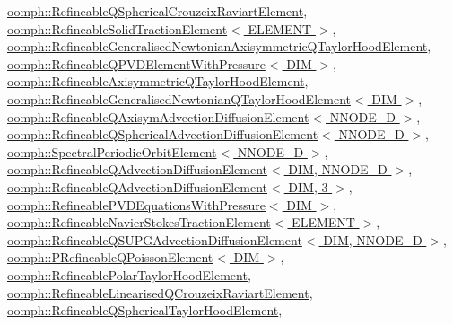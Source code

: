 \hyperlink{classoomph_1_1RefineableQSphericalCrouzeixRaviartElement_ab2d2448ca25da6b58a565a8ca18c5e06}{oomph\+::\+Refineable\+Q\+Spherical\+Crouzeix\+Raviart\+Element}, \hyperlink{classoomph_1_1RefineableSolidTractionElement_a9119a5b387cf3e5c3e3dee4dcabb08a3}{oomph\+::\+Refineable\+Solid\+Traction\+Element$<$ E\+L\+E\+M\+E\+N\+T $>$}, \hyperlink{classoomph_1_1RefineableGeneralisedNewtonianAxisymmetricQTaylorHoodElement_a9c1262e9d7ec08866b86214da5730f3c}{oomph\+::\+Refineable\+Generalised\+Newtonian\+Axisymmetric\+Q\+Taylor\+Hood\+Element}, \hyperlink{classoomph_1_1RefineableQPVDElementWithPressure_aa73ec04c55ee434543ee171bdd1da914}{oomph\+::\+Refineable\+Q\+P\+V\+D\+Element\+With\+Pressure$<$ D\+I\+M $>$}, \hyperlink{classoomph_1_1RefineableAxisymmetricQTaylorHoodElement_af1fe431fc8cdb9df1533b58bef408c49}{oomph\+::\+Refineable\+Axisymmetric\+Q\+Taylor\+Hood\+Element}, \hyperlink{classoomph_1_1RefineableGeneralisedNewtonianQTaylorHoodElement_a010adb919ba9b8850e5f586467777052}{oomph\+::\+Refineable\+Generalised\+Newtonian\+Q\+Taylor\+Hood\+Element$<$ D\+I\+M $>$}, \hyperlink{classoomph_1_1RefineableQAxisymAdvectionDiffusionElement_a6882fc29a65017f8971fcc1785556aad}{oomph\+::\+Refineable\+Q\+Axisym\+Advection\+Diffusion\+Element$<$ N\+N\+O\+D\+E\+\_\+D $>$}, \hyperlink{classoomph_1_1RefineableQSphericalAdvectionDiffusionElement_a3ad036632c6661a525cb472405e86147}{oomph\+::\+Refineable\+Q\+Spherical\+Advection\+Diffusion\+Element$<$ N\+N\+O\+D\+E\+\_\+D $>$}, \hyperlink{classoomph_1_1SpectralPeriodicOrbitElement_a7a1e61b3aa06a7402448215c6b99dcc3}{oomph\+::\+Spectral\+Periodic\+Orbit\+Element$<$ N\+N\+O\+D\+E\+\_\+D $>$}, \hyperlink{classoomph_1_1RefineableQAdvectionDiffusionElement_acc6081866ab4080702515823f1eea83c}{oomph\+::\+Refineable\+Q\+Advection\+Diffusion\+Element$<$ D\+I\+M, N\+N\+O\+D\+E\+\_\+D $>$}, \hyperlink{classoomph_1_1RefineableQAdvectionDiffusionElement_acc6081866ab4080702515823f1eea83c}{oomph\+::\+Refineable\+Q\+Advection\+Diffusion\+Element$<$ D\+I\+M, 3 $>$}, \hyperlink{classoomph_1_1RefineablePVDEquationsWithPressure_a16bc4f58cc9a079c8db705306a23b41b}{oomph\+::\+Refineable\+P\+V\+D\+Equations\+With\+Pressure$<$ D\+I\+M $>$}, \hyperlink{classoomph_1_1RefineableNavierStokesTractionElement_aacf85441dd068c931aca90171e1e20fb}{oomph\+::\+Refineable\+Navier\+Stokes\+Traction\+Element$<$ E\+L\+E\+M\+E\+N\+T $>$}, \hyperlink{classoomph_1_1RefineableQSUPGAdvectionDiffusionElement_ac95d2278e21e486b84d50c086d453dcd}{oomph\+::\+Refineable\+Q\+S\+U\+P\+G\+Advection\+Diffusion\+Element$<$ D\+I\+M, N\+N\+O\+D\+E\+\_\+D $>$}, \hyperlink{classoomph_1_1PRefineableQPoissonElement_a1841e8c6ebcea0efc212a871e03dec24}{oomph\+::\+P\+Refineable\+Q\+Poisson\+Element$<$ D\+I\+M $>$}, \hyperlink{classoomph_1_1RefineablePolarTaylorHoodElement_a2920bff5873ab548bee53764784a8aa1}{oomph\+::\+Refineable\+Polar\+Taylor\+Hood\+Element}, \hyperlink{classoomph_1_1RefineableLinearisedQCrouzeixRaviartElement_ad47315487ff8a24b4cb68a8ae9886091}{oomph\+::\+Refineable\+Linearised\+Q\+Crouzeix\+Raviart\+Element}, \hyperlink{classoomph_1_1RefineableQSphericalTaylorHoodElement_a613dbf83fb63f7a6cfee3bee9336b99d}{oomph\+::\+Refineable\+Q\+Spherical\+Taylor\+Hood\+Element}, 